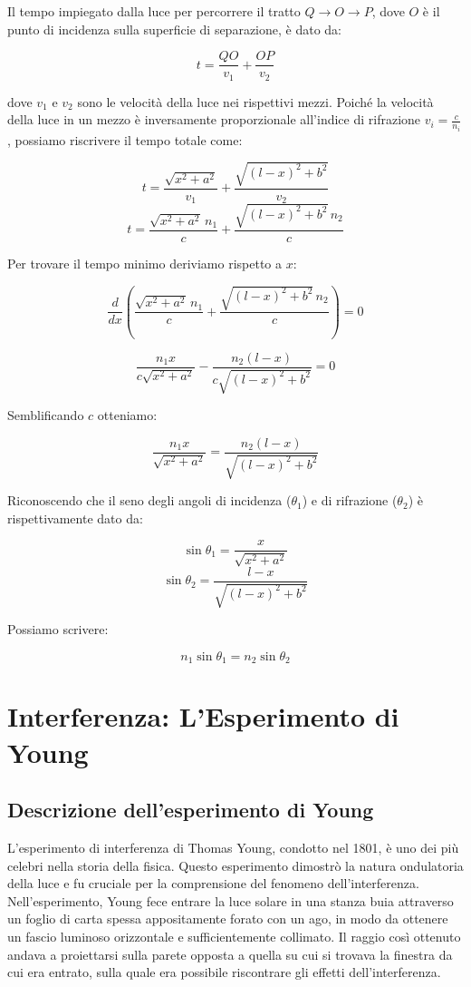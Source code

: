 \documentclass[12pt,a4paper]{report}
\begin{document}
Il tempo impiegato dalla luce per percorrere il tratto \( Q \to O \to P \), dove \( O \) è il punto di incidenza sulla superficie di separazione, è dato da:

\[ t = \frac{QO}{v_1} + \frac{OP}{v_2} \]

dove \( v_1 \) e \( v_2 \) sono le velocità della luce nei rispettivi mezzi. Poiché la velocità della luce in un mezzo è inversamente proporzionale all'indice di rifrazione \( v_i = \frac{c}{n_i} \), possiamo riscrivere il tempo totale come:

\[ t = \frac{\sqrt{x^2 + a^2}}{v_1} + \frac{\sqrt{(l - x)^2 + b^2}}{v_2} \]
\[ t = \frac{\sqrt{x^2 + a^2} \, n_1}{c} + \frac{\sqrt{(l - x)^2 + b^2} \, n_2}{c} \]

Per trovare il tempo minimo deriviamo rispetto a \( x \):

\[ \frac{d}{dx} \left( \frac{\sqrt{x^2 + a^2} \, n_1}{c} + \frac{\sqrt{(l - x)^2 + b^2} \, n_2}{c} \right) = 0 \]

\[ \frac{n_1 x}{c \sqrt{x^2 + a^2}} - \frac{n_2 (l - x)}{c \sqrt{(l - x)^2 + b^2}} = 0 \]

Semblificando  \( c \) otteniamo:

\[ \frac{n_1 x}{\sqrt{x^2 + a^2}} = \frac{n_2 (l - x)}{\sqrt{(l - x)^2 + b^2}} \]

Riconoscendo che il seno degli angoli di incidenza (\( \theta_1 \)) e di rifrazione (\( \theta_2 \)) è rispettivamente dato da:

\[ \sin \theta_1 = \frac{x}{\sqrt{x^2 + a^2}} \]
\[ \sin \theta_2 = \frac{l - x}{\sqrt{(l - x)^2 + b^2}} \]

Possiamo scrivere:

\[ n_1 \sin \theta_1 = n_2 \sin \theta_2 \]

\section{Interferenza: L'Esperimento di Young}

\subsection{Descrizione dell'esperimento di Young}

L'esperimento di interferenza di Thomas Young, condotto nel 1801, è uno dei più celebri nella storia della fisica. Questo esperimento dimostrò la natura ondulatoria della luce e fu cruciale per la comprensione del fenomeno dell'interferenza. Nell'esperimento, Young fece entrare la luce solare in una stanza buia attraverso un foglio di carta spessa appositamente forato con un ago, in modo da ottenere un fascio luminoso orizzontale e sufficientemente collimato. Il raggio così ottenuto andava a proiettarsi sulla parete opposta a quella su cui si trovava la finestra da cui era entrato, sulla quale era possibile riscontrare gli effetti dell'interferenza.
\end{document}
